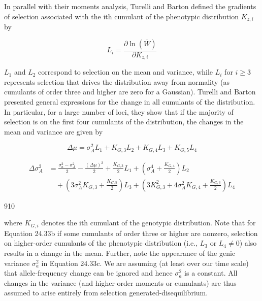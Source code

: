 \documentclass{article}
\begin{document}
In parallel with their moments analysis, Turelli and Barton defined the gradients of selection associated with the ith cumulant of the phenotypic distribution  $ K_{z,i} $ by

\begin{equation}
L_{i}=\frac{\partial\ln(\overline{W})}{\partial K_{z,i}}
\tag{24.33a}
\label{eq:24_33a}
\end{equation}

 $ L_{1} $ and  $ L_{2} $ correspond to selection on the mean and variance, while  $ L_{i} $ for  $ i \geq 3 $ represents selection that drives the distribution away from normality (as cumulants of order three and higher are zero for a Gaussian). Turelli and Barton presented general expressions for the change in all cumulants of the distribution. In particular, for a large number of loci, they show that if the majority of selection is on the first four cumulants of the distribution, the changes in the mean and variance are given by

\begin{equation}
\Delta\mu=\sigma_{A}^{2}L_{1}+K_{G,3}L_{2}+K_{G,4}L_{3}+K_{G,5}L_{4}
\tag{24.33b}
\label{eq:24_33b}
\end{equation}

\begin{equation}
\begin{aligned}\Delta\sigma_{A}^{2}&=\frac{\sigma_{a}^{2}-\sigma_{A}^{2}}{2}-\frac{\left(\Delta\mu\right)^{2}}{2}+\frac{K_{G,3}}{2}L_{1}+\left(\sigma_{A}^{4}+\frac{K_{G,4}}{2}\right)L_{2}\\&\quad+\left(3\sigma_{A}^{2}K_{G,3}+\frac{K_{G,5}}{2}\right)L_{3}+\left(3K_{G,3}^{2}+4\sigma_{A}^{2}K_{G,4}+\frac{K_{G,6}}{2}\right)L_{4}\end{aligned}
\tag{24.33c}
\label{eq:24_33c}
\end{equation}

910

where  $ K_{G,i} $ denotes the ith cumulant of the genotypic distribution. Note that for Equation 24.33b if some cumulants of order three or higher are nonzero, selection on higher-order cumulants of the phenotypic distribution (i.e.,  $ L_3 $ or  $ L_4 \neq 0 $) also results in a change in the mean. Further, note the appearance of the genic variance  $ \sigma_a^2 $ in Equation 24.33c. We are assuming (at least over our time scale) that allele-frequency change can be ignored and hence  $ \sigma_a^2 $ is a constant. All changes in the variance (and higher-order moments or cumulants) are thus assumed to arise entirely from selection generated-disequilibrium.
\end{document}
